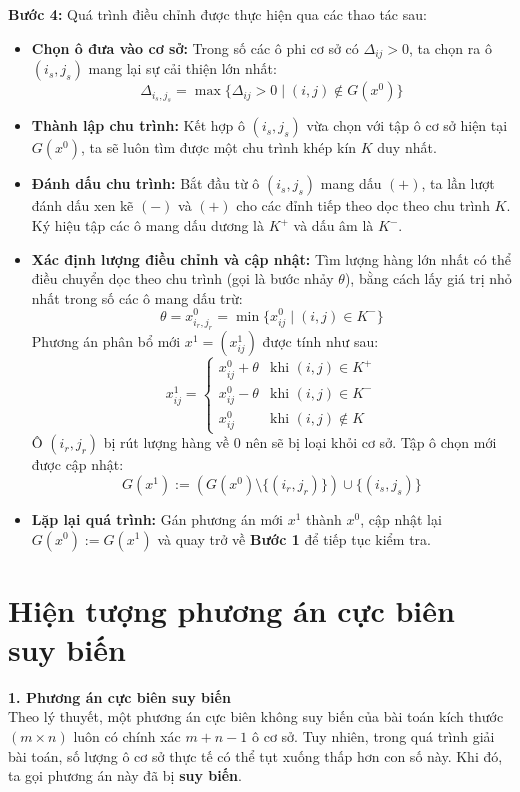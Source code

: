 \documentclass[../main.tex]{subfiles}
\begin{document}
\textbf{Bước 4:}
Quá trình điều chỉnh được thực hiện qua các thao tác sau:
\begin{itemize}
    \item[(4.1)] \textbf{Chọn ô đưa vào cơ sở:} Trong số các ô phi cơ sở có $\Delta_{ij} > 0$, ta chọn ra ô $(i_s, j_s)$ mang lại sự cải thiện lớn nhất:
    \[ \Delta_{i_s, j_s} = \max \{ \Delta_{ij} > 0 \mid (i,j) \notin G(x^0) \} \]
    \item[(4.2)] \textbf{Thành lập chu trình:} Kết hợp ô $(i_s, j_s)$ vừa chọn với tập ô cơ sở hiện tại $G(x^0)$, ta sẽ luôn tìm được một chu trình khép kín $K$ duy nhất.
    \item[(4.3)] \textbf{Đánh dấu chu trình:} Bắt đầu từ ô $(i_s, j_s)$ mang dấu $(+)$, ta lần lượt đánh dấu xen kẽ $(-)$ và $(+)$ cho các đỉnh tiếp theo dọc theo chu trình $K$. Ký hiệu tập các ô mang dấu dương là $K^+$ và dấu âm là $K^-$.
    \item[(4.4)] \textbf{Xác định lượng điều chỉnh và cập nhật:} Tìm lượng hàng lớn nhất có thể điều chuyển dọc theo chu trình (gọi là bước nhảy $\theta$), bằng cách lấy giá trị nhỏ nhất trong số các ô mang dấu trừ:
    \[ \theta = x^0_{i_r, j_r} = \min \{ x^0_{ij} \mid (i,j) \in K^- \} \]
    Phương án phân bổ mới $x^1 = (x^1_{ij})$ được tính như sau:
    \[ 
    x^1_{ij} = 
    \begin{cases} 
        x^0_{ij} + \theta & \text{khi } (i,j) \in K^+ \\
        x^0_{ij} - \theta & \text{khi } (i,j) \in K^- \\
        x^0_{ij} & \text{khi } (i,j) \notin K
    \end{cases} 
    \]
    Ô $(i_r, j_r)$ bị rút lượng hàng về $0$ nên sẽ bị loại khỏi cơ sở. Tập ô chọn mới được cập nhật:
    \[ G(x^1) := (G(x^0) \setminus \{(i_r, j_r)\}) \cup \{(i_s, j_s)\} \]
    \item[(4.5)] \textbf{Lặp lại quá trình:} Gán phương án mới $x^1$ thành $x^0$, cập nhật lại $G(x^0) := G(x^1)$ và quay trở về \textbf{Bước 1} để tiếp tục kiểm tra.
\end{itemize}

\section{Hiện tượng phương án cực biên suy biến}

\textbf{1. Phương án cực biên suy biến} \\
Theo lý thuyết, một phương án cực biên không suy biến của bài toán kích thước $(m \times n)$ luôn có chính xác $m+n-1$ ô cơ sở. Tuy nhiên, trong quá trình giải bài toán, số lượng ô cơ sở thực tế có thể tụt xuống thấp hơn con số này. Khi đó, ta gọi phương án này đã bị \textbf{suy biến}.
\end{document}
